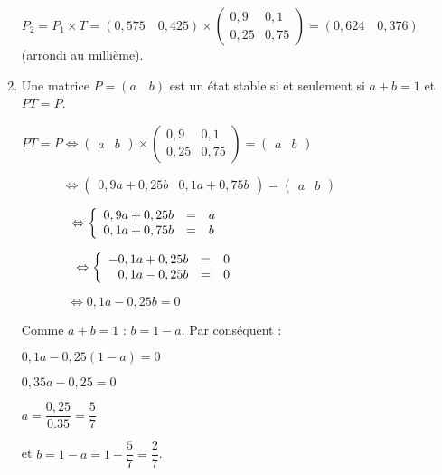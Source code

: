 \begin{corrige}
\begin{enumerate}
          \par
          $P_2 = P_1 \times T = (0,575 \quad 0,425) \times \begin{pmatrix}
               0,9 & 0,1\\
               0,25 & 0,75
          \end{pmatrix} = (0,624 \quad 0,376)$ \\(arrondi au millième).
          \item
          Une matrice $P = (a\quad b)$ est un état stable si et seulement si ${a + b = 1}$ et $PT = P$.
          \par
          $PT=P \Leftrightarrow \begin{pmatrix} a&b\end{pmatrix}
          \times \begin{pmatrix} 0,9 & 0,1\\0,25 & 0,75 \end{pmatrix}
          =\begin{pmatrix} a&b\end{pmatrix}$
          \par
          $\phantom{PT=P} \Leftrightarrow \begin{pmatrix} 0,9a+0,25b & 0,1a+0,75b\end{pmatrix}
          =\begin{pmatrix} a&b\end{pmatrix}$
          \par
          $\phantom{PT=P} \Leftrightarrow
          \left\lbrace
          \begin{array}{r c l}
               0,9a+0,25b  &=& a\\
               0,1a+0,75b  &=& b
          \end{array}
     \right.$
     \par
     $\phantom{PM=P} \Leftrightarrow
     \left\lbrace
     \begin{array}{r c l}
          -0,1a+0,25b  &=& 0\\
          0,1a-0,25b  &=& 0
     \end{array}
\right.$
\par
$\phantom{PM=P}
\Leftrightarrow
0,1a-0,25b = 0$
\par
Comme $a+b=1$ : $b=1-a$. Par conséquent :
\par
$0,1a-0,25(1-a) = 0$
\par
$0,35a-0,25 = 0$
\par
$a = \dfrac{0,25}{0.35}=\dfrac{5}{7}$
\par
et $b=1-a=1-\dfrac{5}{7}=\dfrac{2}{7}$.

\end{enumerate}
\end{corrige}
